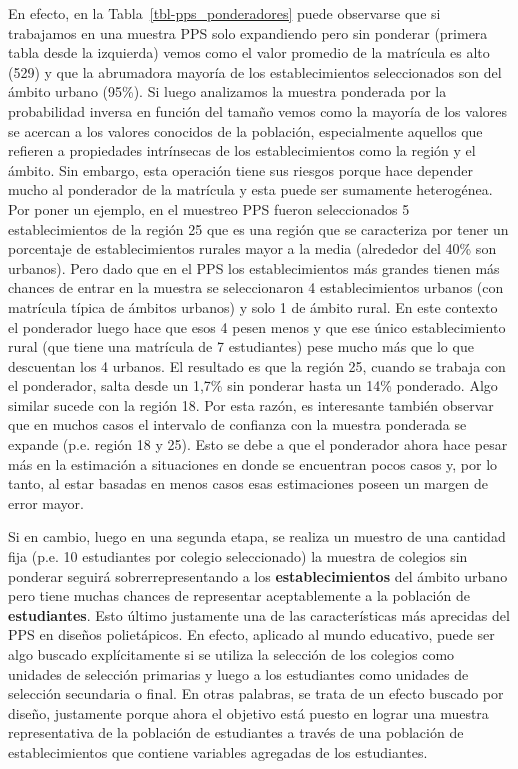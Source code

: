 \documentclass[
  spanish,
  a4paper,
]{scrreprt}
\begin{document}
En efecto, en la Tabla~\ref{tbl-pps_ponderadores} puede observarse que
si trabajamos en una muestra PPS solo expandiendo pero sin ponderar
(primera tabla desde la izquierda) vemos como el valor promedio de la
matrícula es alto (529) y que la abrumadora mayoría de los
establecimientos seleccionados son del ámbito urbano (95\%). Si luego
analizamos la muestra ponderada por la probabilidad inversa en función
del tamaño vemos como la mayoría de los valores se acercan a los valores
conocidos de la población, especialmente aquellos que refieren a
propiedades intrínsecas de los establecimientos como la región y el
ámbito. Sin embargo, esta operación tiene sus riesgos porque hace
depender mucho al ponderador de la matrícula y esta puede ser sumamente
heterogénea. Por poner un ejemplo, en el muestreo PPS fueron
seleccionados 5 establecimientos de la región 25 que es una región que
se caracteriza por tener un porcentaje de establecimientos rurales mayor
a la media (alrededor del 40\% son urbanos). Pero dado que en el PPS los
establecimientos más grandes tienen más chances de entrar en la muestra
se seleccionaron 4 establecimientos urbanos (con matrícula típica de
ámbitos urbanos) y solo 1 de ámbito rural. En este contexto el
ponderador luego hace que esos 4 pesen menos y que ese único
establecimiento rural (que tiene una matrícula de 7 estudiantes) pese
mucho más que lo que descuentan los 4 urbanos. El resultado es que la
región 25, cuando se trabaja con el ponderador, salta desde un 1,7\% sin
ponderar hasta un 14\% ponderado. Algo similar sucede con la región 18.
Por esta razón, es interesante también observar que en muchos casos el
intervalo de confianza con la muestra ponderada se expande (p.e. región
18 y 25). Esto se debe a que el ponderador ahora hace pesar más en la
estimación a situaciones en donde se encuentran pocos casos y, por lo
tanto, al estar basadas en menos casos esas estimaciones poseen un
margen de error mayor.

Si en cambio, luego en una segunda etapa, se realiza un muestro de una
cantidad fija (p.e. 10 estudiantes por colegio seleccionado) la muestra
de colegios sin ponderar seguirá sobrerrepresentando a los
\textbf{establecimientos} del ámbito urbano pero tiene muchas chances de
representar aceptablemente a la población de \textbf{estudiantes}. Esto
último justamente una de las características más aprecidas del PPS en
diseños polietápicos. En efecto, aplicado al mundo educativo, puede ser
algo buscado explícitamente si se utiliza la selección de los colegios
como unidades de selección primarias y luego a los estudiantes como
unidades de selección secundaria o final. En otras palabras, se trata de
un efecto buscado por diseño, justamente porque ahora el objetivo está
puesto en lograr una muestra representativa de la población de
estudiantes a través de una población de establecimientos que contiene
variables agregadas de los estudiantes.
\end{document}
